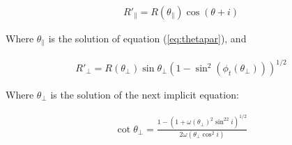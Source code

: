 \begin{align}
R'_\parallel = R(\theta_\parallel)\cos(\theta + i) \label{eq:Rpar} 
\end{align}

Where $\theta_\parallel$ is the solution of equation (\ref{eq:thetapar}), and

\begin{align}
R'_\perp = R(\theta_\perp)\sin\theta_\perp\left(1-\sin^2(\phi_t(\theta_\perp))\right)^{1/2}
\end{align}

Where $\theta_\perp$ is the solution of the next implicit equation:

\begin{align}
\cot\theta_\perp = \frac{1-\left(1+\omega(\theta_\perp)^2\sin^22i\right)^{1/2}}{2\omega(\theta_\perp\cos^2 i)}
\end{align}



